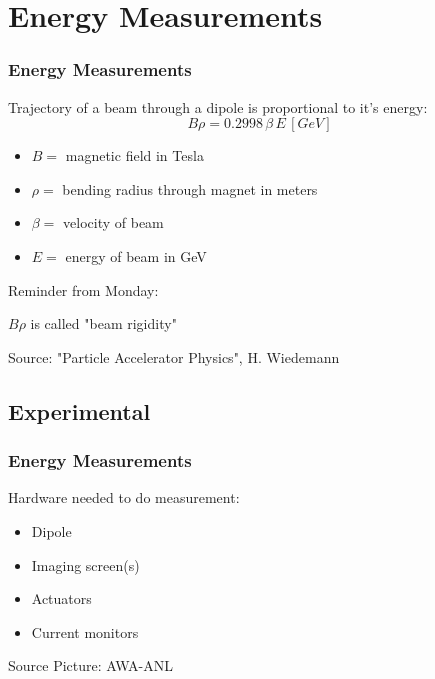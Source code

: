 \documentclass[professionalfonts,t]{beamer}
\begin{document}
\fi

\iftrue
\section{Energy Measurements}
\begin{frame}
	\frametitle{Energy Measurements}
	Trajectory of a beam through a dipole is proportional to it's energy:
	\begin{equation}
		B \rho = 0.2998 \, \beta \, E \, [GeV]
	\end{equation}
	\begin{itemize}
		\item $B = $ magnetic field in Tesla
		\item $\rho =$ bending radius through magnet in meters
		\item $\beta =$ velocity of beam
		\item $E = $ energy of beam in GeV 
	\end{itemize}

\vspace{1em}
Reminder from Monday:

$B\rho$ is called "beam rigidity"

\vspace{1em}
Source: "Particle Accelerator Physics", H. Wiedemann
\end{frame}


\subsection{Experimental}
\begin{frame}
\frametitle{Energy Measurements}
\centering
\vspace{1em}

\begin{minipage}{0.35\textwidth}
Hardware needed to do measurement:
\begin{itemize}
	\item Dipole
	\item Imaging screen(s)
	\item Actuators
	\item Current monitors
\end{itemize}	
\end{minipage}\hfill \hfill
\begin{minipage}{0.6\textwidth}
\end{minipage}

\vspace{1em}
\hfill Source Picture: AWA-ANL
\end{frame}
\end{document}

